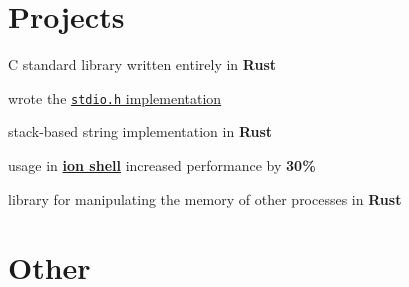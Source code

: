 \documentclass[a4paper]{style}
\begin{document}
\begin{minipage}[t]{0.45\textwidth} %


\section{Projects}
    \vspace{7pt}
    \begin{tightitemize}
        \item C standard library written entirely in \textbf{Rust}
        \item wrote the \href{https://github.com/redox-os/relibc/pull/85}{\texttt{stdio.h} implementation}
    \end{tightitemize}
    \vspace{-1pt}
    \begin{tightitemize}
        \item stack-based string implementation in \textbf{Rust}
        \item usage in \href{https://gitlab.redox-os.org/redox-os/ion}{\textbf{ion shell}} increased performance by \textbf{30\%}
    \end{tightitemize}
    \vspace{-1pt}
    \begin{tightitemize}
        \item library for manipulating the memory of other processes in \textbf{Rust}
    \end{tightitemize}

\sectionspace{}


\section{Other}

\end{minipage}
\end{document}
